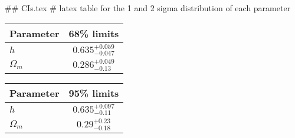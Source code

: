 ## CIs.tex
# latex table for the 1 and 2 sigma distribution of each parameter

\begin{tabular} { l  c}
 Parameter &  68\% limits\\
\hline
{\boldmath$h              $} & $0.635^{+0.059}_{-0.047}   $\\
{\boldmath$\Omega_m       $} & $0.286^{+0.049}_{-0.13}    $\\
\hline
\end{tabular}

\begin{tabular} { l  c}
 Parameter &  95\% limits\\
\hline
{\boldmath$h              $} & $0.635^{+0.097}_{-0.11}    $\\
{\boldmath$\Omega_m       $} & $0.29^{+0.23}_{-0.18}      $\\
\hline
\end{tabular}
